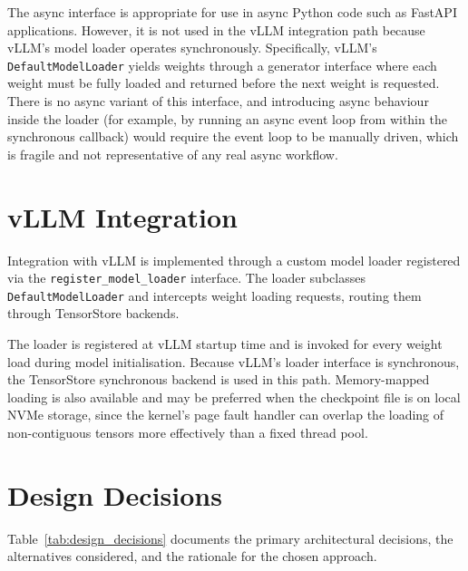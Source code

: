 The async interface is appropriate for use in async Python code such as FastAPI applications. However, it is not used in the vLLM integration path because vLLM's model loader operates synchronously. Specifically, vLLM's \texttt{DefaultModelLoader} yields weights through a generator interface where each weight must be fully loaded and returned before the next weight is requested. There is no async variant of this interface, and introducing async behaviour inside the loader (for example, by running an async event loop from within the synchronous callback) would require the event loop to be manually driven, which is fragile and not representative of any real async workflow.

\section{vLLM Integration}

Integration with vLLM is implemented through a custom model loader registered via the \texttt{register\_model\_loader} interface. The loader subclasses \texttt{DefaultModelLoader} and intercepts weight loading requests, routing them through TensorStore backends.

The loader is registered at vLLM startup time and is invoked for every weight load during model initialisation. Because vLLM's loader interface is synchronous, the TensorStore synchronous backend is used in this path. Memory-mapped loading is also available and may be preferred when the checkpoint file is on local NVMe storage, since the kernel's page fault handler can overlap the loading of non-contiguous tensors more effectively than a fixed thread pool.

\section{Design Decisions}

Table~\ref{tab:design_decisions} documents the primary architectural decisions, the alternatives considered, and the rationale for the chosen approach.


